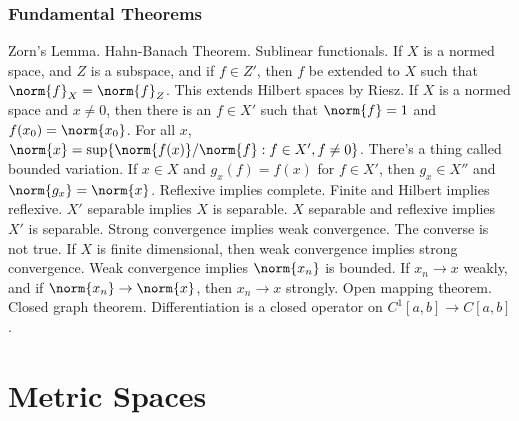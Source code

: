             \subsubsection{Fundamental Theorems}
                Zorn's Lemma. Hahn-Banach Theorem. Sublinear functionals.
                If $X$ is a normed space, and $Z$ is a subspace, and if
                $f\in{Z'}$, then $f$ be extended to $X$ such that
                $\norm{f}_{X}=\norm{f}_{Z}$.
                This extends Hilbert spaces by Riesz.
                If $X$ is a normed space
                and $x\ne{0}$, then there is an $f\in{X'}$ such that
                $\norm{f}=1$ and $f(x_{0})=\norm{x_{0}}$.
                For all $x$,
                $\norm{x}=\sup\{\norm{f(x)}/\norm{f}:f\in{X'},f\ne{0}\}$.
                There's a thing called bounded variation.
                If $x\in{X}$ and
                $g_{x}(f)=f(x)$ for $f\in{X'}$, then
                $g_{x}\in{X''}$ and $\norm{g_{x}}=\norm{x}$.
                Reflexive implies complete.
                Finite and Hilbert implies reflexive.
                $X'$ separable implies $X$ is separable.
                $X$ separable and reflexive implies
                $X'$ is separable.
                Strong convergence implies weak convergence.
                The converse is not true. If $X$ is finite
                dimensional, then weak convergence
                implies strong convergence. Weak convergence implies
                $\norm{x_{n}}$ is bounded. If
                $x_{n}\rightarrow{x}$ weakly, and if
                $\norm{x_{n}}\rightarrow\norm{x}$, then
                $x_{n}\rightarrow{x}$ strongly.
                Open mapping theorem.
                Closed graph theorem.
                Differentiation is a closed operator on
                $C^{1}[a,b]\rightarrow{C[a,b]}$.
    \section{Metric Spaces}
